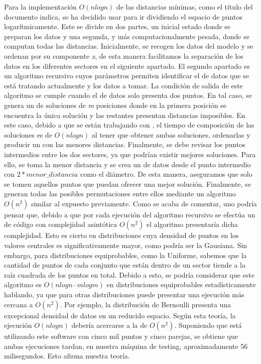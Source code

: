 Para la implementación $O(nlogn)$ de las distancias mínimas, como el título del documento indica, se ha decidido usar  para ir dividiendo el espacio de puntos logarítmicamente. Este se divide en dos partes, un inicial estado donde se preparan los datos y una segunda, y más computacionalmente pesada, donde se computan todas las distancias. Inicialmente, se recogen los datos del modelo y se ordenan por su componente \textit{x}, de esta manera facilitamos la separación de los datos en los diferentes sectores en el siguiente apartado. El segundo apartado es un algoritmo recursivo cuyos parámetros permiten identificar el  de datos que se está tratando actualmente y los datos a tomar. La condición de salida de este algoritmo se cumple cuando el  de datos solo presenta dos puntos. En tal caso, se genera un  de soluciones de \textit{m} posiciones donde en la primera posición se encuentra la única solución y las restantes presentan distancias imposibles. En este caso, debido a que se están trabajando con , el tiempo de composición de las soluciones es de $O(nlogn)$ al tener que obtener ambas soluciones, ordenarlas y producir un  con las menores distancias. Finalmente, se debe revisar los puntos intermedios entre los dos sectores, ya que podrían existir mejores soluciones. Para ello, se toma la menor distancia y se crea un  de datos desde el punto intermedio con $2*menor\_distancia$ como el diámetro. De esta manera, aseguramos que solo se tomen aquellos puntos que puedan ofrecer una mejor solución. Finalmente, se generan todas las posibles permutaciones entre ellos mediante un algoritmo $O(n^2)$ similar al expuesto previamente. Como se acaba de comentar, uno podría pensar que, debido a que por cada ejecución del algoritmo recursivo se efectúa un  de código con complejidad asintótica $O(n^2)$ el algoritmo presentaría dicha complejidad. Esto es cierto en distribuciones cuya densidad de puntos en los valores centrales es significativamente mayor, como podría ser la Gausiana. Sin embargo, para distribuciones equiprobables, como la Uniforme, sabemos que la cantidad de puntos de cada conjunto que están dentro de un sector tiende a la raíz cuadrada de los puntos en total. Debido a esto, se podría considerar que este algoritmo es $O(nlogn·mlogm)$ en distribuciones equiprobables estadísticamente hablando, ya que para otras distribuciones puede presentar una ejecución más cercana a $O(n^2)$. Por ejemplo, la distribución de Bernoulli presenta una excepcional densidad de datos en un reducido espacio. Según esta teoría, la ejecución $O(nlogn)$ debería acercarse a la de $O(n^2)$. Suponiendo que está utilizando este software con cinco mil puntos y cinco parejas, se obtiene que ambas ejecuciones tardan, en nuestra máquina de testing, aproximadamente 56 milisegundos. Esto afirma nuestra teoría. \\

